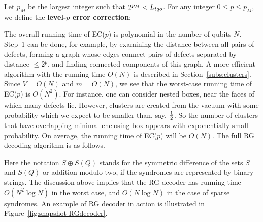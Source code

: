 Let $p_{M}$ be the largest integer such that $2^{p_M} < {L_{tqo}}$.
For any integer $0\le p\le p_M$, we define
the {\bf level-$p$ error correction}:
\begin{center}
\end{center}
The overall running time of EC($p$)  is polynomial in the number of qubits $N$.
Step~1 can be done, for example, by examining the distance between all pairs of defects,
forming a graph whose edges connect pairs of defects separated by distance $\le 2^p$, and finding
connected components of this graph.
A more efficient algorithm with the running time $O(N)$
is described in Section~\ref{subs:clusters}.
Since $V=O(N)$ and $m=O(N)$,
we see that the worst-case running time of EC($p$) is $O(N^2)$.
For instance, one can consider nested boxes,
near the faces of which many defects lie.
However, clusters are created from the vacuum
with some probability which we expect to be smaller than, say, $\frac{1}{2}$.
So the number of clusters that have overlapping minimal enclosing box
appears with exponentially small probability.
On average, the running time of EC($p$) will be $O(N)$.
%
The full RG decoding algorithm is as follows.
\begin{center}
\end{center}
Here the notation $S\oplus S(Q)$ stands for the symmetric difference of the sets
$S$ and $S(Q)$ or addition modulo two, if the syndromes are represented by binary strings.
The discussion above implies that the RG decoder has running time $O(N^2\log{N})$ in the worst case,
and $O(N\log{N})$ in the case of sparse syndromes.
An example of RG decoder in action is illustrated in Figure~\ref{fig:snapshot-RGdecoder}.

